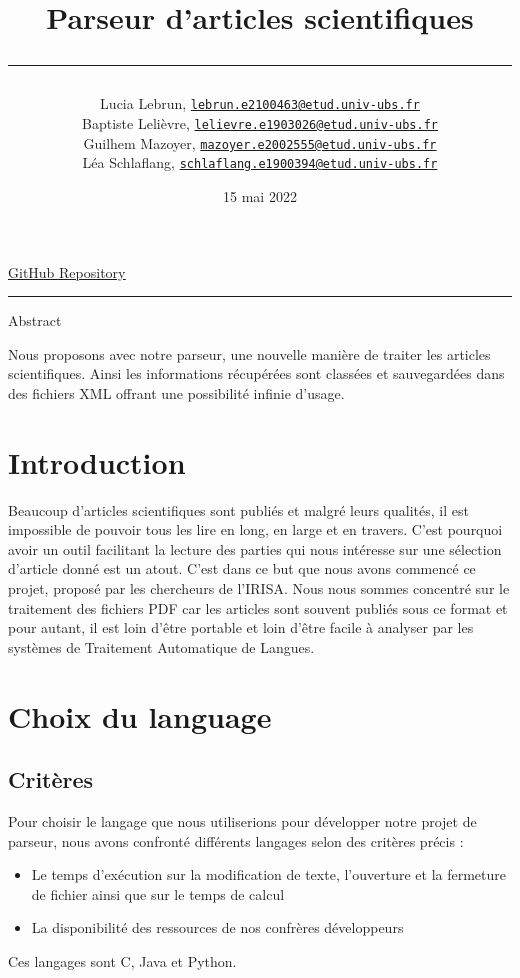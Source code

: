 \documentclass[12pt, final]{article}
\title{{\fonttitle Parseur d'articles scientifiques 
    \par\noindent\rule{\textwidth}{0.4pt}}}
\author{Lucia Lebrun, \texttt{\href{mailto:lebrun.e2100463@etud.univ-ubs.fr}{lebrun.e2100463@etud.univ-ubs.fr}}
    \\ Baptiste Lelièvre, \texttt{\href{mailto:lelievre.e1903026@etud.univ-ubs.fr}{lelievre.e1903026@etud.univ-ubs.fr}}
    \\ Guilhem Mazoyer, \texttt{\href{mailto:mazoyer.e2002555@etud.univ-ubs.fr}{mazoyer.e2002555@etud.univ-ubs.fr}}
    \\ Léa Schlaflang, \texttt{\href{mailto:schlaflang.e1900394@etud.univ-ubs.fr}{schlaflang.e1900394@etud.univ-ubs.fr}}}
\affil{Université Bretagne Sud, Vannes, France}
\date{15 mai 2022}
\begin{document}
    \maketitle
    
    \begin{center}
        \begin{fontsubsection}
            \href{https://github.com/guilhemmazoyer/Parseur_lbgl}{\underline{GitHub Repository}}
        \end{fontsubsection}
    \end{center}
    
    \par\noindent\rule{\textwidth}{0.4pt}
    \newpage{}
    
    \tableofcontents
    \newpage{}
        
    \begin{fontsection}Abstract\end{fontsection}\newline
    Nous proposons avec notre parseur, une nouvelle manière de traiter les articles scientifiques. Ainsi les informations récupérées sont classées et sauvegardées dans des fichiers XML offrant une possibilité infinie d'usage.
    
    \section{\fontsection Introduction}
    Beaucoup d'articles scientifiques sont publiés et malgré leurs qualités, il est impossible de pouvoir tous les lire en long, en large et en travers. C'est pourquoi avoir un outil facilitant la lecture des parties qui nous intéresse sur une sélection d'article donné est un atout. C'est dans ce but que nous avons commencé ce projet, proposé par les chercheurs de l'IRISA.\newline
    Nous nous sommes concentré sur le traitement des fichiers PDF car les articles sont souvent publiés sous ce format et pour autant, il est loin d’être portable et loin d’être facile à analyser par les systèmes de Traitement Automatique de Langues.
        
    \section{\fontsection Choix du language}
        \subsection{\fontsubsection Critères}
        Pour choisir le langage que nous utiliserions pour développer notre projet de parseur, nous avons confronté différents langages selon des critères précis :
        \begin{itemize}
            \item Le temps d'exécution sur la modification de texte, l'ouverture et la fermeture de fichier ainsi que sur le temps de calcul
            \item La disponibilité des ressources de nos confrères développeurs
        \end{itemize}
        Ces langages sont C, Java et Python.
\end{document}

